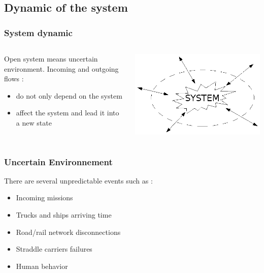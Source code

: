 \documentclass{beamer}
\begin{document}
\subsection*{Dynamic of the system}
\begin{frame}
\frametitle{System dynamic}
	\begin{columns}
		\begin{column}[l]{8cm}
			Open system means uncertain environment. Incoming and outgoing flows : 
			\begin{itemize}
				\item do not only depend on the system
				\item affect the system and lead it into a new state
			\end{itemize}
		\end{column}
		\begin{column}[r]{4cm}
			\begin{center}
				\includegraphics[height=.30\textheight]{fig/openSystem.png}
			\end{center}
	 	\end{column}
	\end{columns}
\end{frame}
\begin{frame}
\frametitle{Uncertain Environnement}
	There are several unpredictable events such as :
	  \begin{itemize}
	  \item Incoming missions
	  \item Trucks and ships arriving time
	  \item Road/rail network disconnections
	  \item Straddle carriers failures
	  \item Human behavior %
	\end{itemize}
\end{frame}
\end{document}
